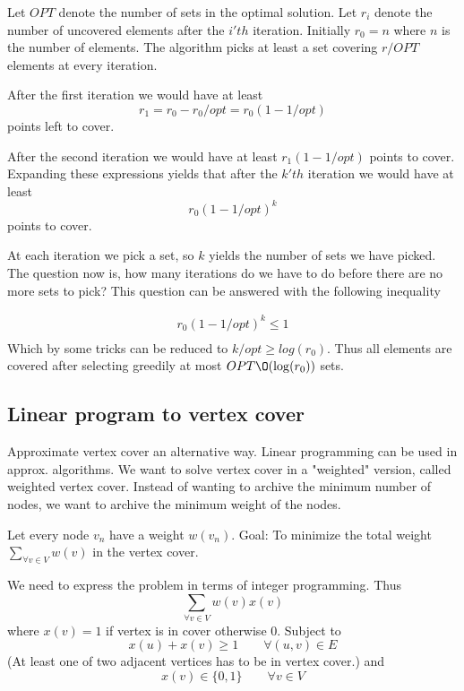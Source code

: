 \documentclass[10pt]{article}
\begin{document}
Let $OPT$ denote the number of sets in the optimal solution. Let $r_i$ denote the number of uncovered elements after the $i'th$ iteration. Initially $r_0 = n$ where $n$ is the number of elements. The algorithm picks at least a set covering $r/OPT$ elements at every iteration. 

After the first iteration we would have at least 
\begin{equation}
r_1 = r_0-r_0/opt=r_0(1-1/opt)  
\end{equation}
points left to cover. 

After the second iteration we would have at least $r_1(1-1/opt)$ points to cover. Expanding these expressions yields that after the $k'th$ iteration we would have at least 
\begin{equation}
  r_0(1-1/opt)^k  
\end{equation}
points to cover.

At each iteration we pick a set, so $k$ yields the number of sets we have picked. The question now is, how many iterations do we have to do before there are no more sets to pick? This question can be answered with the following inequality

\begin{align}
r_0(1-1/opt)^k \leq 1 \\
\end{align}
Which by some tricks can be reduced to $k/opt \geq log(r_0)$. Thus all elements are covered after selecting greedily at most $OPT \O(\log(r_0))$ sets.

\subsection{Linear program to vertex cover} %
\label{sub:linear_program_to_set_cover}
Approximate vertex cover an alternative way. Linear programming can be used in approx. algorithms. We want to solve vertex cover in a "weighted" version, called weighted vertex cover. Instead of wanting to archive the minimum number of nodes, we want to archive the minimum weight of the nodes.

Let every node $v_n$ have a weight $w(v_n)$. Goal: To minimize the total weight $\sum_{\forall v \in V} w(v)$ in the vertex cover. 

We need to express the problem in terms of integer programming. Thus
\begin{equation}
\sum_{\forall v \in V} w(v) x(v)  
\end{equation}
where $x(v)=1$ if vertex is in cover otherwise $0$. Subject to
\begin{equation}
  x(u)+x(v) \geq 1 \qquad \forall (u,v) \in E
\end{equation}
(At least one of two adjacent vertices has to be in vertex cover.) and
\begin{equation}
    x(v)  \in \{0,1\} \qquad \forall v \in V 
\end{equation}
\end{document}
